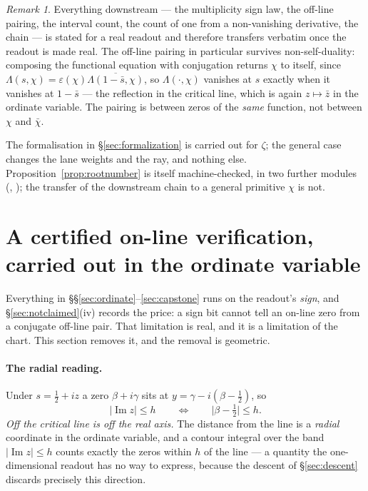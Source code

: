 \documentclass[11pt]{article}
\theoremstyle{plain}
\theoremstyle{definition}
\theoremstyle{remark}
\newtheorem{remark}[theorem]{Remark}
\newcommand{\lean}[1]{\texttt{\detokenize{#1}}}
\begin{document}
\begin{remark}
Everything downstream --- the multiplicity sign law, the off-line pairing, the interval
count, the count of one from a non-vanishing derivative, the chain --- is stated for a
real readout and therefore transfers verbatim once the readout is made real. The
off-line pairing in particular survives non-self-duality: composing the functional
equation with conjugation returns $\chi$ to itself, since
$\Lambda(s,\chi)=\varepsilon(\chi)\overline{\Lambda(1-\bar s,\chi)}$, so
$\Lambda(\cdot,\chi)$ vanishes at $s$ exactly when it vanishes at $1-\bar s$ --- the
reflection in the critical line, which is again $z\mapsto\bar z$ in the ordinate
variable. The pairing is between zeros of the \emph{same} function, not between $\chi$
and $\bar\chi$.

The formalisation in \S\ref{sec:formalization} is carried out for $\zeta$; the general
case changes the lane weights and the ray, and nothing else. Proposition~\ref{prop:rootnumber}
is itself machine-checked, in two further modules
(\lean{HingeKernel.lean}, \lean{UnitMidpoint.lean}); the transfer of the downstream
chain to a general primitive $\chi$ is not.
\end{remark}

\section{A certified on-line verification, carried out in the ordinate
variable}\label{sec:bandverify}

Everything in \S\S\ref{sec:ordinate}--\ref{sec:capstone} runs on the readout's \emph{sign},
and \S\ref{sec:notclaimed}(iv) records the price: a sign bit cannot tell an on-line zero
from a conjugate off-line pair. That limitation is real, and it is a limitation of the
chart. This section removes it, and the removal is geometric.

\paragraph{The radial reading.} Under $s=\tfrac12+iz$ a zero $\beta+i\gamma$ sits at
$y=\gamma-i(\beta-\tfrac12)$, so
\[
  \lvert\operatorname{Im}z\rvert\le h
  \qquad\Longleftrightarrow\qquad
  \bigl\lvert\beta-\tfrac12\bigr\rvert\le h .
\]
\emph{Off the critical line is off the real axis.} The distance from the line is a
\emph{radial} coordinate in the ordinate variable, and a contour integral over the band
$\lvert\operatorname{Im}z\rvert\le h$ counts exactly the zeros within $h$ of the line ---
a quantity the one-dimensional readout has no way to express, because the descent of
\S\ref{sec:descent} discards precisely this direction.
\end{document}
